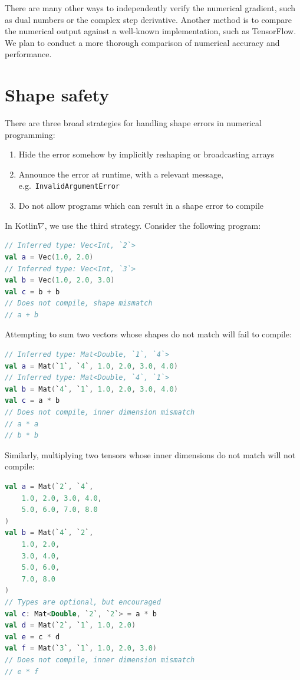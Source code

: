 \documentclass[12pt,initial,twoside,maitrise]{dms}
\numberwithin{equation}{section}
\numberwithin{table}{chapter}
\numberwithin{figure}{chapter}
\begin{document}
There are many other ways to independently verify the numerical gradient, such as dual numbers or the complex step derivative. Another method is to compare the numerical output against a well-known implementation, such as TensorFlow. We plan to conduct a more thorough comparison of numerical accuracy and performance.

\section{Shape safety}\label{sec:shape-safety}

\noindent There are three broad strategies for handling shape errors in numerical programming: \\

\begin{enumerate}
    \item Hide the error somehow by implicitly reshaping or broadcasting arrays
    \item Announce the error at runtime, with a relevant message, e.g.~\texttt{InvalidArgumentError}
    \item Do not allow programs which can result in a shape error to compile \\
\end{enumerate}

\noindent In Kotlin$\nabla$, we use the third strategy. Consider the following program:

\begin{lstlisting}[language=Kotlin]
// Inferred type: Vec<Int, `2`>
val a = Vec(1.0, 2.0)
// Inferred type: Vec<Int, `3`>
val b = Vec(1.0, 2.0, 3.0)
val c = b + b
// Does not compile, shape mismatch
// a + b
\end{lstlisting}

\noindent Attempting to sum two vectors whose shapes do not match will fail to compile:

\begin{lstlisting}[language=Kotlin]
// Inferred type: Mat<Double, `1`, `4`>
val a = Mat(`1`, `4`, 1.0, 2.0, 3.0, 4.0)
// Inferred type: Mat<Double, `4`, `1`>
val b = Mat(`4`, `1`, 1.0, 2.0, 3.0, 4.0)
val c = a * b
// Does not compile, inner dimension mismatch
// a * a
// b * b
\end{lstlisting}

\noindent Similarly, multiplying two tensors whose inner dimensions do not match will not compile:

\begin{lstlisting}[language=Kotlin]
val a = Mat(`2`, `4`,
    1.0, 2.0, 3.0, 4.0,
    5.0, 6.0, 7.0, 8.0
)
val b = Mat(`4`, `2`,
    1.0, 2.0,
    3.0, 4.0,
    5.0, 6.0,
    7.0, 8.0
)
// Types are optional, but encouraged
val c: Mat<Double, `2`, `2`> = a * b
val d = Mat(`2`, `1`, 1.0, 2.0)
val e = c * d
val f = Mat(`3`, `1`, 1.0, 2.0, 3.0)
// Does not compile, inner dimension mismatch
// e * f
\end{lstlisting}
\end{document}
